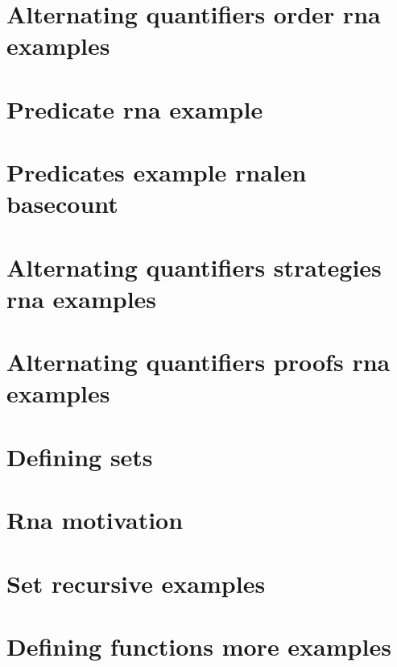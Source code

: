
\section*{Alternating quantifiers order rna examples}

\vfill
\section*{Predicate rna example}

\vfill
\section*{Predicates example rnalen basecount}

\vfill
\section*{Alternating quantifiers strategies rna examples}

\vfill
\section*{Alternating quantifiers proofs rna examples}

\vfill
\section*{Defining sets}

\vfill
\section*{Rna motivation}

\vfill
\section*{Set recursive examples}

\vfill
\section*{Defining functions more examples}

\vfill

